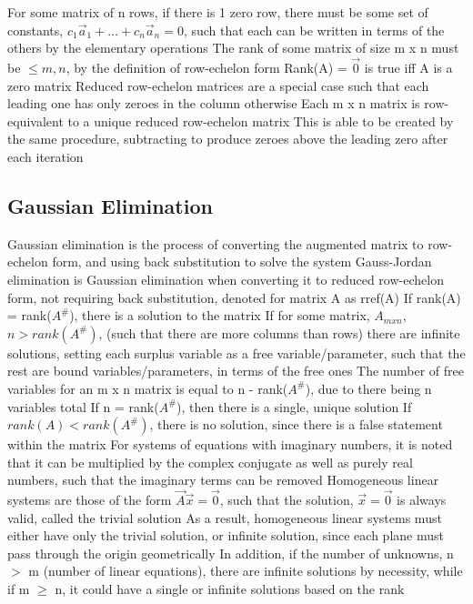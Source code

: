 \documentclass[11 pt, twoside]{article}
\newenvironment{outline*}
{
	\begin{outline}[enumerate]
	}
	{\end{outline}
}
\begin{document}
\begin{outline*}
\2 For some matrix of n rows, if there is 1 zero row, there must be some set of constants, $c_1\vec{a}_1 + \dots + c_n\vec{a}_n = 0$, such that each can be written in terms of the others by the elementary operations
\2 The rank of some matrix of size m x n must be $\leq m, n$, by the definition of row-echelon form
\2 Rank(A) = $\vec{0}$ is true iff A is a zero matrix
\1 Reduced row-echelon matrices are a special case such that each leading one has only zeroes in the column otherwise
\2 Each m x n matrix is row-equivalent to a unique reduced row-echelon matrix
\2 This is able to be created by the same procedure, subtracting to produce zeroes above the leading zero after each iteration
\end{outline*}
\subsection{Gaussian Elimination}
\begin{outline*}
\1 Gaussian elimination is the process of converting the augmented matrix to row-echelon form, and using back substitution to solve the system 
\2 Gauss-Jordan elimination is Gaussian elimination when converting it to reduced row-echelon form, not requiring back substitution, denoted for matrix A as rref(A)
\2 If rank(A) = rank($A^\#$), there is a solution to the matrix
\3 If for some matrix, $A_{mxn}$, $n > rank(A^\#)$, (such that there are more columns than rows) there are infinite solutions, setting each surplus variable as a free variable/parameter, such that the rest are bound variables/parameters, in terms of the free ones
\3 The number of free variables for an m x n matrix is equal to n - rank($A^\#$), due to there being n variables total
\3 If n = rank($A^\#$), then there is a single, unique solution
\2 If $rank(A) < rank(A^\#)$, there is no solution, since there is a false statement within the matrix
\1 For systems of equations with imaginary numbers, it is noted that it can be multiplied by the complex conjugate as well as purely real numbers, such that the imaginary terms can be removed
\1 Homogeneous linear systems are those of the form $\vec{A}\vec{x} = \vec{0}$, such that the solution, $\vec{x} = \vec{0}$ is always valid, called the trivial solution
\2 As a result, homogeneous linear systems must either have only the trivial solution, or infinite solution, since each plane must pass through the origin geometrically
\2 In addition, if the number of unknowns, n $>$ m (number of linear equations), there are infinite solutions by necessity, while if m $\geq$ n, it could have a single or infinite solutions based on the  rank
\end{outline*}
\end{document}
